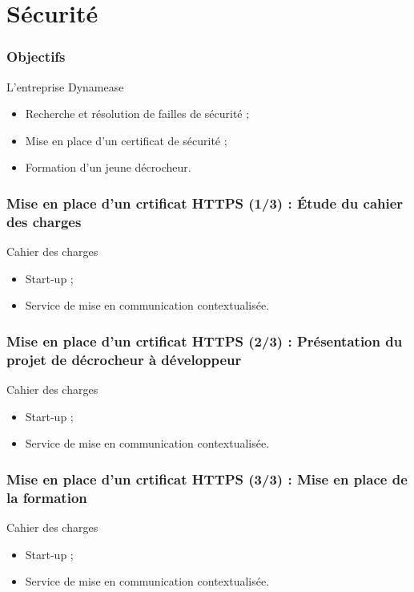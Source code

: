 \section{Sécurité}
\author{Kévin Moreau}


\begin{frame}
	\frametitle{Objectifs}

	\begin{block}{L'entreprise Dynamease}
	 \begin{itemize}
      \item Recherche et résolution de failles de sécurité ;
	  \item Mise en place d'un certificat de sécurité ;
	  \item Formation d'un jeune décrocheur.
	 \end{itemize}
	\end{block}
\end{frame}

\begin{frame}
	\frametitle{Mise en place d'un crtificat HTTPS (1/3) : Étude du cahier des charges}

	\begin{block}{Cahier des charges}
	 \begin{itemize}
      \item Start-up ;
	  \item Service de mise en communication contextualisée.
	 \end{itemize}
	\end{block}
\end{frame}

\begin{frame}
	\frametitle{Mise en place d'un crtificat HTTPS (2/3) : Présentation du projet de décrocheur à développeur}

	\begin{block}{Cahier des charges}
	 \begin{itemize}
      \item Start-up ;
	  \item Service de mise en communication contextualisée.
	 \end{itemize}
	\end{block}
\end{frame}

\begin{frame}
	\frametitle{Mise en place d'un crtificat HTTPS (3/3) : Mise en place de la formation}

	\begin{block}{Cahier des charges}
	 \begin{itemize}
      \item Start-up ;
	  \item Service de mise en communication contextualisée.
	 \end{itemize}
	\end{block}
\end{frame}

